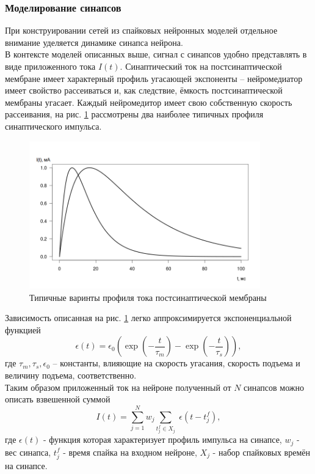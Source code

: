 \documentclass[a4paper,10pt]{article}
\begin{document}
\subsubsection{Моделирование синапсов}\label{sec:sim_mod}
\indent При конструировании сетей из спайковых нейронных моделей отдельное внимание уделяется динамике синапса нейрона.\\ 
\indent В контексте моделей описанных выше, сигнал с синапсов удобно представлять в виде приложенного тока $I(t)$. Синаптический ток на постсинаптической мембране имеет характерный профиль угасающей экспоненты -- нейромедиатор имеет свойство рассеиваться и, как следствие, ёмкость постсинаптической мембраны угасает. Каждый нейромедитор имеет свою собственную скорость рассеивания, на рис. \ref{syn_exp_pic} рассмотрены два наиболее типичных профиля синаптического импульса.
\begin{figure}[ht]
\centering
\captionsetup{justification=centering,margin=1cm}
\includegraphics[width=100mm,scale=1]{syn_exp.png}
\caption{Типичные варинты профиля тока постсинаптической мембраны}
\label{syn_exp_pic}
\end{figure}
\FloatBarrier
Зависимость описанная на рис. \ref{syn_exp_pic} легко аппроксимируется экспоненциальной функцией 
\begin{equation*}\label{eq:epsp}
\epsilon(t) =	\epsilon_0\left(\exp\left(-\frac{t}{\tau_{m}}\right)-\exp\left(-\frac{t}{\tau_{s}}\right)\right),
\end{equation*}
где $\tau_m, \tau_s, \epsilon_{0}$ -- константы, влияющие на скорость угасания, скорость подъема и величину подъема, соответственно.\\
\indent Таким образом приложенный ток на нейроне полученный от $N$ синапсов можно описать взвешенной суммой
\begin{equation*}\label{eq:iaf_syn}
I(t) = \sum_{j=1}^{N} w_{j} \sum_{t_{j}^{f}\in X_{j}} \; \epsilon(t-t_{j}^{f}),
\end{equation*}
где $\epsilon(t)$ - функция которая характеризует профиль импульса на синапсе, $w_{j}$ - вес синапса, $t_{j}^{f}$ - время спайка на входном нейроне, $X_{j}$ - набор спайковых времён на синапсе.\\
\end{document}
